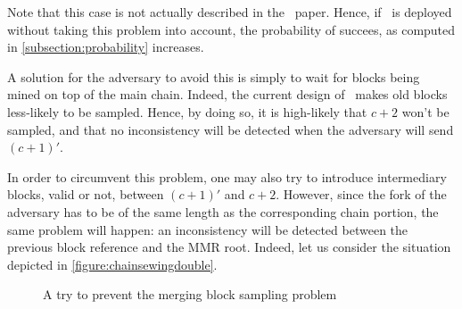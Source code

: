       Note that this case is not actually described in the \FC\ paper. Hence, if \FC\ is deployed without taking this problem into account, the probability of succees, as computed in \autoref{subsection:probability} increases. 
      
      A solution for the adversary to avoid this is simply to wait for blocks being mined on top of the main chain. Indeed, the current design of \FC\ makes old blocks less-likely to be sampled. Hence, by doing so, it is high-likely that \(c+2\) won't be sampled, and that no inconsistency will be detected when the adversary will send \((c+1)'\).
      
      In order to circumvent this problem, one may also try to introduce intermediary blocks, valid or not, between \((c+1)'\) and \(c+2\). However, since the fork of the adversary has to be of the same length as the corresponding chain portion, the same problem will happen: an inconsistency will be detected between the previous block reference and the MMR root. Indeed, let us consider the situation depicted in \autoref{figure:chainsewingdouble}.
      
      \begin{figure}[ht]
        \centering
        \caption{A try to prevent the merging block sampling problem}
        \label{figure:chainsewingdouble}
      \end{figure}
        

